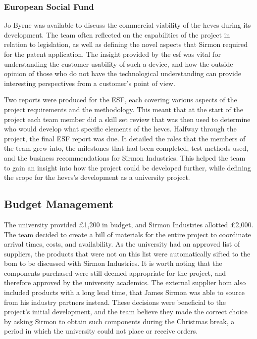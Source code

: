 \documentclass [12pt]{article}
\begin{document}
\subsubsection{European Social Fund}
Jo Byrne was available to discuss the commercial viability of the \gls{hevcs} during its development. The team often reflected on the capabilities of the project in relation to legislation, as well as defining the novel aspects that Sirmon required for the patent application. The insight provided by the \gls{esf} was vital for understanding the customer usability of such a device, and how the outside opinion of those who do not have the technological understanding can provide interesting perspectives from a customer’s point of view.

Two reports were produced for the ESF, each covering various aspects of the project requirements and the methodology. This meant that at the start of the project each team member did a skill set review that was then used to determine who would develop what specific elements of the \gls{hevcs}. Halfway through the project, the final ESF report was due. It detailed the roles that the members of the team grew into, the milestones that had been completed, test methods used, and the business recommendations for Sirmon Industries. This helped the team to gain an insight into how the project could be developed further, while defining the scope for the \gls{hevcs}’s development as a university project.

\subsection{Budget Management}

The university provided £1,200 in budget, and Sirmon Industries allotted £2,000. The team decided to create a bill of materials for the entire project to coordinate arrival times, costs, and availability. As the university had an approved list of suppliers, the products that were not on this list were automatically sifted to the \gls{bom} to be discussed with Sirmon Industries. It is worth noting that the components purchased were still deemed appropriate for the project, and therefore approved by the university academics. The external supplier \gls{bom} also included products with a long lead time, that James Sirmon was able to source from his industry partners instead. These decisions were beneficial to the project’s initial development, and the team believe they made the correct choice by asking Sirmon to obtain such components during the Christmas break, a period in which the university could not place or receive orders.
\end{document}
